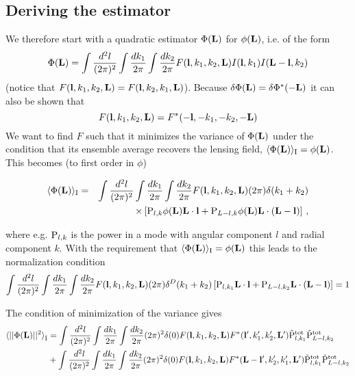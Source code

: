 \documentclass[12pt]{article}
\newcommand{\beq}{\begin{equation}}
\newcommand{\eeq}{\end{equation}}
\newcommand{\beqal}{\begin{aligned}}
\newcommand{\eeqal}{\end{aligned}}
\def\l{{\bf l}}
\def\L{{\bf L}}
\def\iul{{\rm I}}
\def\il{{\tilde{\rm I}}}
\def\pul{{\rm P}}
\def\ptot{{\tilde{\rm P}^{\rm tot}}}
\def\d2l{\frac{d^2l}{(2\pi)^2}}
\def\dko{\frac{dk_1}{2\pi}}
\def\dkt{\frac{dk_2}{2\pi}}
\def\lbox{\mathcal{L}}
\numberwithin{equation}{section}
\begin{document}
%
%
%


\subsection{Deriving the estimator}
We therefore start with a quadratic estimator $\Phi(\L)$ for $\phi(\L)$,
i.e. of the form
\beq
\Phi (\L) = \int \d2l \int \dko \int \dkt F(\l,k_1,k_2,\L)
I(\l,k_1) I(\L-\l,k_2)
\label{eq:quadest}
\eeq
(notice that $F(\l,k_1,k_2,\L)=F(\l,k_2,k_1,\L)$). Because $\delta
\Phi(\L)=\delta \Phi^*(-\L)$ it can also be shown that
\beq
F(\l,k_1,k_2,\L) = F^*(-\l,-k_1,-k_2,-\L)
\eeq
We want to find $F$ such that it minimizes the variance of $\Phi(\L)$
under the condition that its ensemble average recovers the lensing field,
$\langle \Phi(\L)\rangle_\iul = \phi(\L)$. This becomes (to first order in $\phi$)

\beq
\beqal
\langle \Phi(\L)\rangle_\iul &=&  \int \d2l \int \dko \int \dkt  F(\l,k_1,k_2,\L)  (2\pi)\delta(k_1+k_2) \\
& & \times \left[\pul_{l,k} \phi(\L)\L\cdot\l + \pul_{L-l,k}  \phi(\L)\L\cdot(\L-\l)\right] \, ,
\eeqal
\eeq

where e.g. $\pul_{l,k}$ is the power in a mode with angular component $l$ and radial component $k$.
With the requirement that $\langle \Phi(\L)\rangle_\iul=\phi(\L)$ this
leads to the normalization condition
\beq
\int \d2l \int \dko \int \dkt F(\l,k_1,k_2,\L) (2\pi) \delta^D(k_1+k_2)
\left[\pul_{l,k_1}\L\cdot\l + \pul_{L-l,k_2} \L\cdot (\L-\l)\right] = 1
\label{eq:normcond}
\eeq

The condition of minimization of the variance gives 
\beq
\beqal
\langle ||\Phi(\L)||^2\rangle_\il &= \int \d2l \int \dko \int \dkt (2\pi)^2 \delta(0) F(\l,k_1,k_2,\L)
F^*(\l',k_1',k_2',\L') \ptot_{l,k_1}\ptot_{L-l,k_2} \\
&  + \int \d2l \int \dko \int \dkt (2\pi)^2 \delta(0) F(\l,k_1,k_2,\L)
F^*(\L-\l',k_2',k_1',\L') \ptot_{l,k_1}\ptot_{L-l,k_2}
\eeqal
\eeq
\end{document}
